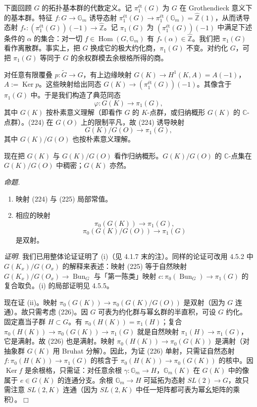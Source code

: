  下面回顾 $G$ 的拓扑基本群的代数定义。记 $\pi_1^{\text{ét}}(G)$ 为 $G$ 在 Grothendieck 意义下的基本群。特征 $f:G\to\mathbb{G}_m$ 诱导态射 $\pi_1^{\text{ét}}(G)\to\pi_1^{\text{ét}}(\mathbb{G}_m)=\hat{\mathbb{Z}}(1)$，从而诱导态射 $f_*:(\pi_1^{\text{ét}}(G))(-1)\to\hat{\mathbb{Z}}$。记 $\pi_1(G)$ 为 $(\pi_1^{\text{ét}}(G))(-1)$ 中满足下述条件的 $\alpha$ 的集合：对一切 $f\in\operatorname{Hom}(G,\mathbb{G}_m)$ 有 $f_*(\alpha)\in\hat{\mathbb{Z}}$。我们把 $\pi_1(G)$ 看作离散群。事实上，把 $G$ 换成它的极大约化商，$\pi_1(G)$ 不变。对约化 $G$，可把 $\pi_1(G)$ 等同于 $G$ 的余权群模去余根格所得的商。

对任意有限覆叠 $p:\tilde{G}\to G$，有上边缘映射 $G(K)\to H^1(K,A)=A(-1)$，$A:=\operatorname{Ker} p$。这些映射给出同态 $G(K)\to(\pi_1^{\text{ét}}(G))(-1)$。其像含于 $\pi_1(G)$ 中。于是我们构造了典范同态
\begin{equation}\tag{224}
\varphi:G(K)\to\pi_1(G),
\end{equation}
其中 $G(K)$ 按朴素意义理解（即看作 $G$ 的 $K$-点群，或归纳概形 $G(K)$ 的 $\mathbb{C}$-点群）。(224) 在 $G(O)$ 上的限制平凡，故 (224) 诱导映射
\begin{equation}\tag{225}
G(K)/G(O)\to\pi_1(G),
\end{equation}
其中 $G(K)/G(O)$ 也按朴素意义理解。

现在把 $G(K)$ 与 $G(K)/G(O)$ 看作归纳概形。$G(K)/G(O)$ 的 $\mathbb{C}$-点集在 $G(K)/G(O)$ 中稠密；$G(K)$ 亦然。

 \emph{命题.}
\begin{enumerate}[label=(\roman*),leftmargin=2.2em]
\item 映射 (224) 与 (225) 局部常值。
\item 相应的映射
\begin{equation}\tag{226}
\pi_0(G(K))\to\pi_1(G),
\end{equation}
\begin{equation}\tag{227}
\pi_0(G(K)/G(O))\to\pi_1(G)
\end{equation}
是双射。
\end{enumerate}

\emph{证明.} 我们已用整体论证证明了 (i)（见 4.1.7 末的注）。同样的论证可改用 4.5.2 中 $G(K_x)/G(O_x)$ 的解释来表述：映射 (225) 等于自然映射 $G(K_x)/G(O_x)\to\operatorname{Bun}_G$ 与「第一陈类」映射 $c:\pi_0(\operatorname{Bun}_G)\to\pi_1(G)$ 的复合取负。(i) 的局部证明见 4.5.5。

现在证 (ii)。映射 $\pi_0(G(K))\to\pi_0(G(K)/G(O))$ 是双射（因为 $G$ 连通）。故只需考虑 (226)。因 $G$ 可表为约化群与幂幺群的半直积，可设 $G$ 约化。固定嘉当子群 $H\subset G$。有 $\pi_0(H(K))=\pi_1(H)$；复合 $\pi_0(H(K))\to\pi_0(G(K))\to\pi_1(G)$ 就是自然映射 $\pi_1(H)\to\pi_1(G)$，它是满射。故 (226) 也是满射。映射 $\pi_0(H(K))\to\pi_0(G(K))$ 是满射（对抽象群 $G(K)$ 用 Bruhat 分解）。因此，为证 (226) 单射，只需证自然态射$f:\pi_0(H(K))\to\pi_1(G)$ 的核含于 $\pi_0(H(K))\to\pi_0(G(K))$ 的核中。因 $\operatorname{Ker} f$ 是余根格，只需证：对任意余根 $\gamma:\mathbb{G}_m\to H$，$\mathbb{G}_m(K)$ 在 $G(K)$ 中的像属于 $e\in G(K)$ 的连通分支。余根 $\mathbb{G}_m\to H$ 可延拓为态射 $SL(2)\to G$，故只需注意 $SL(2,K)$ 连通（因为 $SL(2,K)$ 中任一矩阵都可表为幂幺矩阵的乘积）。\hfill$\Box$

